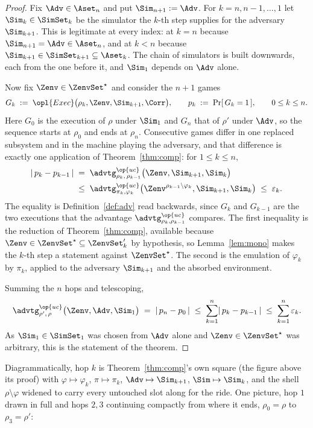 \documentclass[10pt,oneside,openany]{book}
\theoremstyle{accentdef}
\theoremstyle{accentplain}
\begin{document}
\begin{proof}
Fix $\Adv \in \Aset_n$ and put $\Sim_{n+1} := \Adv$. For $k = n, n-1, \dots, 1$ let $\Sim_k \in \SimSet_k$
be the simulator the $k$-th step supplies for the adversary $\Sim_{k+1}$. This is legitimate at
every index: at $k = n$ because $\Sim_{n+1} = \Adv \in \Aset_n$, and at $k < n$ because
$\Sim_{k+1} \in \SimSet_{k+1} \subseteq \Aset_k$. The chain of simulators is built
downwards, each from the one before it, and $\Sim_1$ depends on $\Adv$ alone.

Now fix $\Zenv \in \ZenvSet^{\star}$ and consider the $n+1$ games
\[
  G_k \;:=\; \opl{Exec}\bigl(\rho_k,\Zenv,\Sim_{k+1},\Corr\bigr), \qquad p_k \;:=\; \Pr[\,G_k = 1\,], \qquad 0 \leq k \leq n .
\]
Here $G_0$ is the execution of $\rho$ under $\Sim_1$ and $G_n$ that of $\rho'$ under $\Adv$, so
the sequence starts at $\rho_0$ and ends at $\rho_n$. Consecutive games differ in one replaced
subsystem and in the machine playing the adversary, and that difference is exactly one
application of Theorem~\ref{thm:comp}: for $1 \leq k \leq n$,
\[
  \begin{aligned}
  \lvert\,p_k - p_{k-1}\,\rvert
  \;&=\;
  \advtg^{\op{uc}}_{\rho_k,\,\rho_{k-1}}\bigl(\Zenv,\Sim_{k+1},\Sim_k\bigr) \\
  \;&\leq\;
  \advtg^{\op{uc}}_{\pi_k,\varphi_k}\bigl(\Zenv^{\rho_{k-1} \setminus \varphi_k},\Sim_{k+1},\Sim_k\bigr)
  \;\leq\;
  \varepsilon_k .
  \end{aligned}
\]
The equality is Definition~\ref{def:adv} read backwards, since $G_k$ and $G_{k-1}$ are the two
executions that the advantage $\advtg^{\op{uc}}_{\rho_k,\rho_{k-1}}$ compares. The first
inequality is the reduction of Theorem~\ref{thm:comp}, available because $\Zenv \in \ZenvSet^{\star} \subseteq \ZenvSet_k'$
by hypothesis, so Lemma~\ref{lem:mono} makes the $k$-th step a statement against
$\ZenvSet^{\star}$. The second is the emulation of $\varphi_k$ by $\pi_k$, applied to the
adversary $\Sim_{k+1}$ and the absorbed environment.

Summing the $n$ hops and telescoping,
\[
  \advtg^{\op{uc}}_{\rho',\,\rho}\bigl(\Zenv,\Adv,\Sim_1\bigr)
  \;=\; \lvert\,p_n - p_0\,\rvert
  \;\leq\; \sum_{k=1}^{n} \lvert\,p_k - p_{k-1}\,\rvert
  \;\leq\; \sum_{k=1}^{n} \varepsilon_k .
\]
As $\Sim_1 \in \SimSet_1$ was chosen from $\Adv$ alone and $\Zenv \in \ZenvSet^{\star}$ was
arbitrary, this is the statement of the theorem.
\end{proof}

Diagrammatically, hop $k$ is Theorem~\ref{thm:comp}'s own square (the figure above its proof)
with $\varphi \mapsto \varphi_k$, $\pi \mapsto \pi_k$, $\Adv \mapsto \Sim_{k+1}$,
$\Sim \mapsto \Sim_k$, and the shell $\rho \setminus \varphi$ widened to carry every untouched
slot along for the ride. One picture, hop $1$ drawn in full and hops $2,3$ continuing compactly
from where it ends, $\rho_0 = \rho$ to $\rho_3 = \rho'$:
\end{document}
